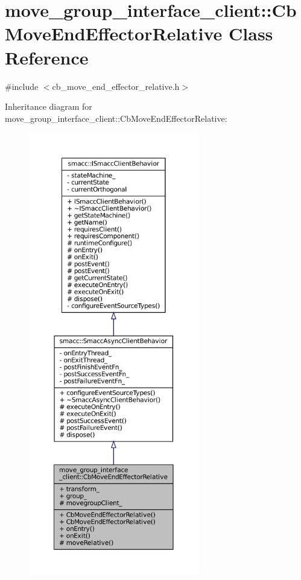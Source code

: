 \hypertarget{classmove__group__interface__client_1_1CbMoveEndEffectorRelative}{}\section{move\+\_\+group\+\_\+interface\+\_\+client\+:\+:Cb\+Move\+End\+Effector\+Relative Class Reference}
\label{classmove__group__interface__client_1_1CbMoveEndEffectorRelative}


{\ttfamily \#include $<$cb\+\_\+move\+\_\+end\+\_\+effector\+\_\+relative.\+h$>$}



Inheritance diagram for move\+\_\+group\+\_\+interface\+\_\+client\+:\+:Cb\+Move\+End\+Effector\+Relative\+:
\nopagebreak
\begin{figure}[H]
\begin{center}
\leavevmode
\includegraphics[height=550pt]{classmove__group__interface__client_1_1CbMoveEndEffectorRelative__inherit__graph}
\end{center}
\end{figure}


